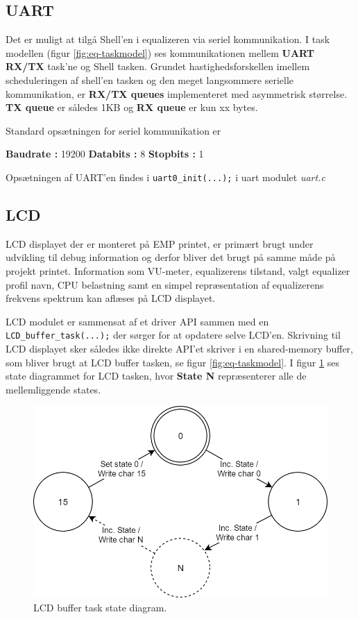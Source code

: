 \subsection{UART}\label{subsec:uart}
Det er muligt at tilgå Shell'en i equalizeren via seriel kommunikation.
I task modellen (figur \ref{fig:eq-taskmodel}) ses kommunikationen mellem \textbf{UART RX/TX} task'ne og Shell tasken.
Grundet hastighedsforskellen imellem scheduleringen af shell'en tasken og den meget langsommere serielle kommunikation, er \textbf{RX/TX queues} implementeret med asymmetrisk størrelse. 
\textbf{TX queue} er således 1KB og \textbf{RX queue} er kun  xx bytes.

Standard opsætningen for seriel kommunikation er
\begin{center}
	\textbf{Baudrate : }19200  \quad \textbf{Databits : } 8 \quad \textbf{Stopbits : }1
\end{center}

Opsætningen af UART'en findes i \texttt{uart0\_init(...);} i uart modulet \textit{uart.c}

\subsection{LCD}
LCD displayet der er monteret på EMP printet, er primært brugt under udvikling til debug information og derfor bliver det brugt på samme måde på projekt printet.
Information som VU-meter, equalizerens tilstand, valgt equalizer profil navn, CPU belastning samt en simpel repræsentation af equalizerens frekvens spektrum kan aflæses på LCD displayet.

LCD modulet er sammensat af et driver API sammen med en \texttt{LCD\_buffer\_task(...);} der sørger for at opdatere selve LCD'en.
Skrivning til LCD displayet sker således ikke direkte
API'et skriver i en shared-memory buffer, som bliver brugt at LCD buffer tasken, se figur \ref{fig:eq-taskmodel}. 
I figur \ref{fig:lcd_task} ses state diagrammet for LCD tasken, hvor \textbf{State N} repræsenterer alle de mellemliggende states.

\begin{figure}[h!]
	\centering
	\includegraphics[width=.6\textwidth]{billeder/lcd_task.png}
	\caption{LCD buffer task state diagram.}
	\label{fig:lcd_task}
\end{figure}


